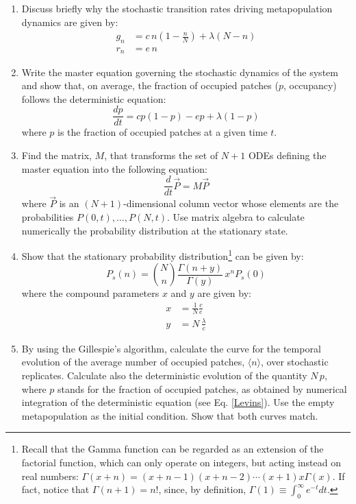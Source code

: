 \documentclass{article}
\begin{document}
\begin{enumerate}
\item Discuss briefly why the stochastic transition rates driving metapopulation dynamics are given by:
\begin{align*}
g_n &= c\,n (1 - \frac{n}{N}) + \lambda (N - n) \\
r_n &= e\,n 
\end{align*}
\item Write the master equation governing the stochastic dynamics of the system and show that, on average, the fraction of occupied patches ($p$, occupancy) follows the deterministic equation:
\begin{equation}
\frac{dp}{dt} = c p (1 - p) - e p + \lambda (1-p) 
\label{Levins}
\end{equation}
where $p$ is the fraction of occupied patches at a given time $t$. 
\item Find the matrix, $M$, that transforms the set of $N+1$ ODEs defining the master equation into the following equation:
\begin{equation*}
\frac{d}{dt} \vec{P} = M \vec{P}
\end{equation*}
where $\vec{P}$ is an $(N+1)$-dimensional column vector whose elements are the probabilities $P(0,t), \dots, P(N,t)$. Use matrix algebra to calculate numerically the probability distribution at the stationary state.  
\item Show that the stationary probability distribution\footnote{Recall that the Gamma function can be regarded as an extension of the factorial function, which can only operate on integers, but acting instead on real numbers: $\Gamma(x+n) = (x+n-1)(x+n-2) \cdots (x+1)x\Gamma(x)$. If fact, notice that $\Gamma(n+1) = n!$, since, by definition, $\Gamma(1)\equiv\int_0^{\infty} e^{-t}dt$.} can be given by:
\begin{equation*}
	P_s(n) = \binom{N}{n} \frac{\Gamma(n+y)}{\Gamma(y)} \, x^n P_s(0)
\end{equation*}
where the compound parameters $x$ and $y$ are given by:
\begin{align*}
x  &= \frac{1}{N}\frac{c}{e} \\
y  &= N\,\frac{\lambda}{c}
\end{align*}
\item By using the Gillespie's algorithm, calculate the curve for the temporal evolution of the average number of occupied patches, $\langle n \rangle$, over stochastic replicates. Calculate also the deterministic evolution of the quantity $N\,p$, where $p$ stands for the fraction of occupied patches, as obtained by numerical integration of the deterministic equation (see Eq. \ref{Levins}). Use the empty metapopulation as the initial condition. Show that both curves match.  
\end{enumerate}
\end{document}
